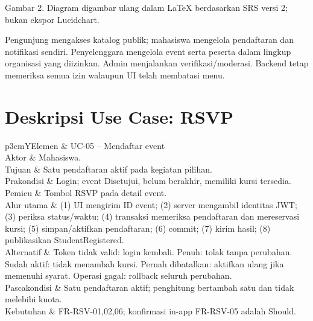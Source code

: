 \documentclass[11pt,a4paper]{article}
\newcommand{\tbl}[2]{\par\smallskip\noindent\begin{tabularx}{\linewidth}{#1}\toprule #2\bottomrule\end{tabularx}\par\smallskip}
\newcommand{\page}[1]{\clearpage\section{#1}}
\begin{document}
\begin{center}\par\small Gambar 2. Diagram digambar ulang dalam LaTeX berdasarkan SRS versi 2; bukan ekspor Lucidchart.\end{center}
Pengunjung mengakses katalog publik; mahasiswa mengelola pendaftaran dan notifikasi sendiri. Penyelenggara mengelola event serta peserta dalam lingkup organisasi yang diizinkan. Admin menjalankan verifikasi/moderasi. Backend tetap memeriksa semua izin walaupun UI telah membatasi menu.
\page{Deskripsi Use Case: RSVP}
\tbl{p{3cm}Y}{Elemen & UC-05 -- Mendaftar event\\\midrule
Aktor & Mahasiswa.\\
Tujuan & Satu pendaftaran aktif pada kegiatan pilihan.\\
Prakondisi & Login; event Disetujui, belum berakhir, memiliki kursi tersedia.\\
Pemicu & Tombol RSVP pada detail event.\\
Alur utama & (1) UI mengirim ID event; (2) server mengambil identitas JWT; (3) periksa status/waktu; (4) transaksi memeriksa pendaftaran dan mereservasi kursi; (5) simpan/aktifkan pendaftaran; (6) commit; (7) kirim hasil; (8) publikasikan StudentRegistered.\\
Alternatif & Token tidak valid: login kembali. Penuh: tolak tanpa perubahan. Sudah aktif: tidak menambah kursi. Pernah dibatalkan: aktifkan ulang jika memenuhi syarat. Operasi gagal: rollback seluruh perubahan.\\
Pascakondisi & Satu pendaftaran aktif; penghitung bertambah satu dan tidak melebihi kuota.\\
Kebutuhan & FR-RSV-01,02,06; konfirmasi in-app FR-RSV-05 adalah Should.\\}
\end{document}
